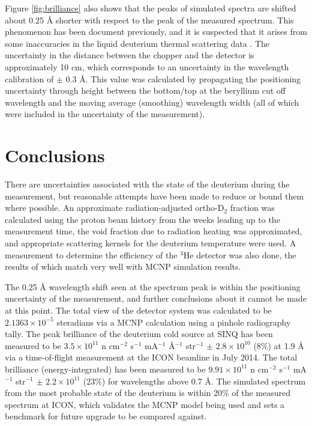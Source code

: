 \documentclass[5p,12pt]{elsarticle}
\begin{document}
Figure \ref{fig:brilliance} also shows that the peaks of simulated spectra are shifted about 0.25 {\AA} shorter with respect to the peak of the measured spectrum.  This phenomenon has been document previously, and it is suspected that it arises from some inaccuracies in the liquid deuterium thermal scattering data \cite{giller_thesis}.  The uncertainty in the distance between the chopper and the detector is approximately 10 cm, which corresponds to an uncertainty in the wavelength calibration of $\pm$ 0.3 {\AA}.  This value was calculated by propagating the positioning uncertainty through height between the bottom/top at the beryllium cut off wavelength and the moving average (smoothing) wavelength width (all of which were included in the uncertainty of the measurement).  

%
%
%
%
%

\section{Conclusions}
\label{sec:conclusions}

There are uncertainties associated with the state of the deuterium during the measurement, but reasonable attempts have been made to reduce or bound them where possible.  An approximate radiation-adjusted ortho-D$_2$ fraction was calculated using the proton beam history from the weeks leading up to the measurement time, the void fraction due to radiation heating was approximated, and appropriate scattering kernels for the deuterium temperature were used.  A measurement to determine the efficiency of the $^3$He detector was also done, the results of which match very well with MCNP simulation results.

The 0.25 {\AA} wavelength shift seen at the spectrum peak is within the positioning uncertainty of the measurement, and further conclusions about it cannot be made at this point.  The total view of the detector system was calculated to be $2.1363\times10^{-5}$ steradians via a MCNP calculation using a pinhole radiography tally.  The peak brilliance of the deuterium cold source at SINQ has been measured to be $3.5\times10^{11}$ n cm$^{-2}$ s$^{-1}$ mA$^{-1}$ \AA$^{-1}$ str$^{-1}$  $\pm$ $2.8\times10^{10}$ (8\%) at 1.9 {\AA} via a time-of-flight measurement at the ICON beamline in July 2014.  The total brilliance (energy-integrated) has been measured to be  $9.91\times10^{11}$  n cm$^{-2}$ s$^{-1}$ mA$^{-1}$ str$^{-1}$ $\pm$ $2.2\times10^{11}$ (23\%) for wavelengths above 0.7 {\AA}.  The simulated spectrum from the most probable state of the deuterium is within 20\% of the measured spectrum at ICON, which validates the MCNP model being used and sets a benchmark for future upgrade to be compared against.  
\end{document}
